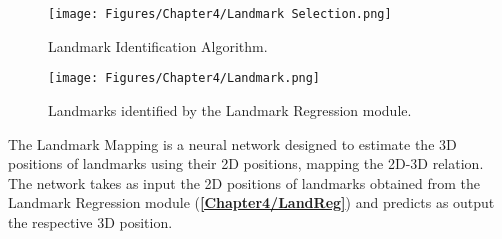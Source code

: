 \begin{figure}[H]
    \centering
    \texttt{[image: Figures/Chapter4/Landmark Selection.png]}
    \caption[Landmark Identification Algorithm.]{Landmark Identification Algorithm.}
    \label{fig:Landmark Identification Algorithm}
\end{figure}

\begin{figure}[H]
    \centering
    \texttt{[image: Figures/Chapter4/Landmark.png]}
    \caption[Landmarks identified by the Landmark Regression module.]{Landmarks identified by the Landmark Regression module.}
    \label{fig:Identified landmarks}
\end{figure}



\newpage
The Landmark Mapping is a neural network designed to estimate the 3D positions of landmarks using their 2D positions, mapping the 2D-3D relation.\\
The network takes as input the 2D positions of landmarks obtained from the Landmark Regression module (\textbf{\ref{Chapter4/LandReg}}) and predicts as output the respective 3D position.

